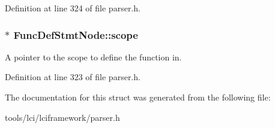 Definition at line 324 of file parser.\-h.

\hypertarget{struct_func_def_stmt_node_a545e8a727dbe8786ab90afa0a4608d68}{
\subsubsection[{scope}]{$\ast$ {\bf Func\-Def\-Stmt\-Node\-::scope}}}\label{struct_func_def_stmt_node_a545e8a727dbe8786ab90afa0a4608d68}
A pointer to the scope to define the function in. 

Definition at line 323 of file parser.\-h.



The documentation for this struct was generated from the following file\-:\begin{DoxyCompactItemize}
\item 
tools/lci/lciframework/parser.\-h\end{DoxyCompactItemize}
